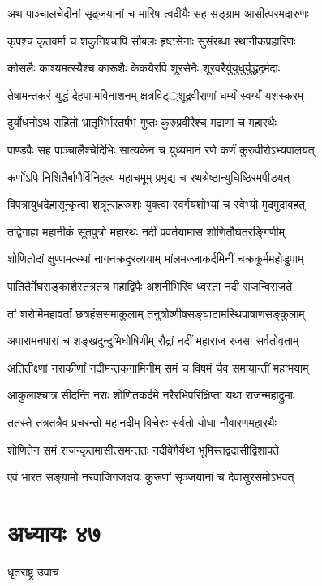 \twolineshloka
{अथ पाञ्चालचेदीनां सृढ्जयानां च मारिष}
{त्वदीयैः सह सङ्ग्राम आसीत्परमदारुणः}


\twolineshloka
{कृपश्च कृतवर्मा च शकुनिश्चापि सौबलः}
{हृष्टसेनाः सुसंरब्धा रथानीकप्रहारिणः}


\twolineshloka
{कोसलैः काश्यमत्स्यैश्च कारूशैः केकयैरपि}
{शूरसेनैः शूरवरैर्युयुधुर्युद्धदुर्मदाः}


\twolineshloka
{तेषामन्तकरं युद्धं देहपाप्मविनाशनम्}
{क्षत्रविट््शूद्रवीराणां धर्म्यं स्वर्ग्यं यशस्करम्}


\twolineshloka
{दुर्योधनोऽथ सहितो भ्रातृभिर्भरतर्षभ}
{गुप्तः कुरुप्रवीरैश्च मद्राणां च महारथैः}


\twolineshloka
{पाण्डवैः सह पाञ्चालैश्चेदिभिः सात्यकेन च}
{युध्यमानं रणे कर्णं कुरुवीरोऽभ्यपालयत्}


\twolineshloka
{कर्णोऽपि निशितैर्बाणैर्विनिहत्य महाचमूम्}
{प्रमृद्य च रथश्रेष्ठान्युधिष्ठिरमपीडयत्}


\twolineshloka
{विपत्रायुधदेहासून्कृत्वा शत्रून्सहस्रशः}
{युक्त्वा स्वर्गयशोभ्यां च स्वेभ्यो मुदमुदावहत्}


\twolineshloka
{तद्विगाह्य महानीकं सूतपुत्रो महारथः}
{नदीं प्रवर्तयामास शोणितौघतरङ्गिणीम्}


\twolineshloka
{शोणितोदां क्षुण्णमत्स्थां नागनक्रदुरत्ययाम्}
{मांलमज्जाकर्दमिनीं चक्रकूर्ममहोडुपाम्}


\twolineshloka
{पातितैर्मेघसङ्काशैस्तत्रतत्र महाद्विपैः}
{अशनीभिरिव ध्वस्ता नदी राजन्विराजते}


\twolineshloka
{तां शरोर्मिमहावर्तां छत्रहंससमाकुलाम्}
{तनुत्रोष्णीषसङ्घाटामस्थिपाषाणसङ्कुलाम्}


\twolineshloka
{अपारामनपारां च शङ्खदुन्दुभिघोषिणीम्}
{रौद्रां नदीं महाराज रजसा सर्वतोवृताम्}


\twolineshloka
{अतितीक्ष्णां नराकीर्णां नदीमन्तकगामिनीम्}
{समं च विषमं चैव समायान्तीं महाभयाम्}


\twolineshloka
{आकुलाश्चात्र सीदन्ति नराः शोणितकर्दमे}
{नरैरभिपरिक्षिप्ता यथा राजन्महाद्रुमाः}


\twolineshloka
{ततस्ते तत्रतत्रैव प्रचरन्तो महानदीम्}
{विचेरुः सर्वतो योधा नौवारणमहारथैः}


\twolineshloka
{शोणितेन समं राजन्कृतमासीत्समन्ततः}
{नदीवेगैर्यथा भूमिस्तद्वदासीद्विशापते}


\twolineshloka
{एवं भारत सङ्ग्रामो नरवाजिगजक्षयः}
{कुरूणां सृञ्जयानां च देवासुरसमोऽभवत्}


\chapter{अध्यायः ४७}
\twolineshloka
{धृतराष्ट्र उवाच}
{}


